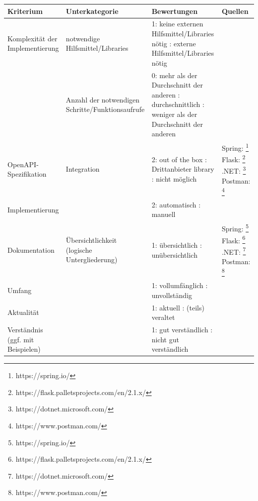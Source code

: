 \documentclass[notitlepage, hidelinks]{article}
\begin{document}
\newpage
\begin{table}[H]
\centering
\begin{minipage}{\textwidth} 
\begin{tabular}{|L{2.5cm}|L{3cm}|L{5.5cm}|L{3cm}|}
\hline
Kriterium & Unterkategorie & Bewertungen & Quellen \\ \hline
Komplexität der Implementierung & notwendige Hilfsmittel/Libraries & 1: keine externen Hilfsmittel/Libraries nötig : externe Hilfsmittel/Libraries nötig &  \\    
& Anzahl der notwendigen Schritte/Funktionsaufrufe & 0: mehr als der Durchschnitt der anderen : durchschnittlich : weniger als der Durchschnitt der anderen &  \\ \hline
OpenAPI-Spezifikation & Integration & 2: out of the box : Drittanbieter library : nicht möglich & Spring: \footnote{https://spring.io/} \newline Flask: \footnote{https://flask.palletsprojects.com/en/2.1.x/} \newline .NET: \footnote{https://dotnet.microsoft.com/} \newline Postman: \footnote{https://www.postman.com/} \\ \hline
Implementierung & & 2: automatisch : manuell &  \\ \hline
Dokumentation & Übersichtlichkeit (logische Untergliederung) & 1: übersichtlich : unübersichtlich & Spring: \footnote{https://spring.io/} \newline Flask: \footnote{https://flask.palletsprojects.com/en/2.1.x/} \newline .NET: \footnote{https://dotnet.microsoft.com/} \newline Postman: \footnote{https://www.postman.com/} \\ \hline
Umfang & & 1: vollumfänglich : unvollständig &  \\ \hline
Aktualität & & 1: aktuell : (teils) veraltet &  \\ \hline
Verständnis (ggf. mit Beispielen) & & 1: gut verständlich : nicht gut verständlich &  \\ \hline

\end{tabular}
\end{minipage}
\end{table}
\end{document}
